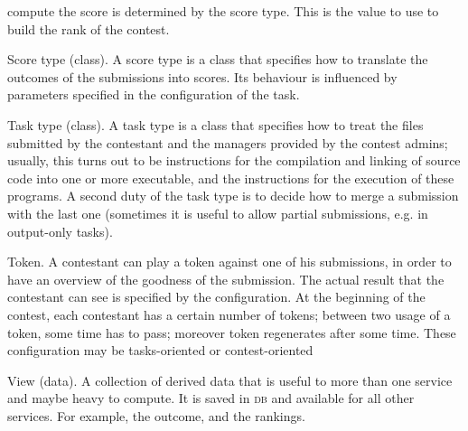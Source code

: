 \documentclass[a4paper,8pt]{amsart}
\newcommand{\DB}{\textsc{db}}
\newenvironment{squishlist}{%
  \begin{list}{\textbullet}%
    { \setlength{\itemsep}{0pt}%
      \setlength{\parsep}{3pt}%
      \setlength{\topsep}{3pt}%
      \setlength{\partopsep}{0pt}%
      \setlength{\leftmargin}{1.5em}%
      \setlength{\labelwidth}{1em}%
      \setlength{\labelsep}{0.5em} }%
}{\end{list}}
\begin{document}
\begin{multicols}{2}
\begin{squishlist}
    compute the score is determined by the score type. This is the
    value to use to build the rank of the contest.
  \item[Score type (class).] A score type is a class that specifies
    how to translate the outcomes of the submissions into scores. Its
    behaviour is influenced by parameters specified in the
    configuration of the task.
  \item[Task type (class).] A task type is a class that specifies how
    to treat the files submitted by the contestant and the managers
    provided by the contest admins; usually, this turns out to be
    instructions for the compilation and linking of source code into
    one or more executable, and the instructions for the execution of
    these programs. A second duty of the task type is to decide how to
    merge a submission with the last one (sometimes it is useful to
    allow partial submissions, e.g. in output-only tasks).
  \item[Token.] A contestant can play a token against one of his
    submissions, in order to have an overview of the goodness of the
    submission. The actual result that the contestant can see is
    specified by the configuration. At the beginning of the contest,
    each contestant has a certain number of tokens; between two usage
    of a token, some time has to pass; moreover token regenerates
    after some time. These configuration may be tasks-oriented or
    contest-oriented
  \item[View (data).] A collection of derived data that is useful to
    more than one service and maybe heavy to compute. It is saved in
    \DB{} and available for all other services. For example, the
    outcome, and the rankings.
  \end{squishlist}
\end{multicols}
\end{document}
